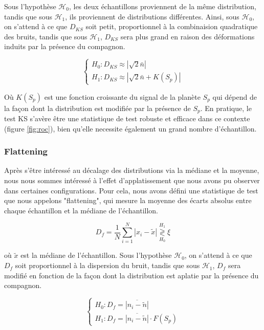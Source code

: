 \documentclass{article}
\begin{document}
Sous l'hypothèse $\mathcal{H}_0$, les deux échantillons proviennent de la même distribution, tandis que sous $\mathcal{H}_1$, ils proviennent de distributions différentes. Ainsi, sous $\mathcal{H}_0$, on s'attend à ce que $D_{KS}$ soit petit, proportionnel à la combinaision quadratique des bruits, tandis que sous $\mathcal{H}_1$, $D_{KS}$ sera plus grand en raison des déformations induits par la présence du compagnon.

$$
\begin{cases}
H_0 : D_{KS} \approx |\sqrt{2}\bar{n}|\\
H_1 : D_{KS} \approx |\sqrt{2}\bar{n} + K(S_p)|
\end{cases}
$$

Où $K(S_p)$ est une fonction croissante du signal de la planète $S_p$ qui dépend de la façon dont la distribution est modifiée par la présence de $S_p$. En pratique, le test KS s'avère être une statistique de test robuste et efficace dans ce contexte (figure \ref{fig:roc}), bien qu'elle necessite également un grand nombre d'échantillon.



\subsubsection{Flattening}

Après s'être intéressé au décalage des distributions via la médiane et la moyenne, nous nous sommes intéressé à l'effet d'applatissement que nous avons pu observer dans certaines configurations. Pour cela, nous avons défini une statistique de test que nous appelons "flattening", qui mesure la moyenne des écarts absolus entre chaque échantillon et la médiane de l'échantillon.

$$
D_f = \frac 1 N \sum_{i=1}^N |x_i - \tilde{x}| \stackrel{H_1}{\underset{H_0}{\gtrless}} \xi
$$

où $\tilde{x}$ est la médiane de l'échantillon. Sous l'hypothèse $\mathcal{H}_0$, on s'attend à ce que $D_f$ soit proportionnel à la dispersion du bruit, tandis que sous $\mathcal{H}_1$, $D_f$ sera modifié en fonction de la façon dont la distribution est aplatie par la présence du compagnon.

$$
\begin{cases}
H_0 : D_f = \overline{|n_i - \tilde{n}|}\\
H_1 : D_f = \overline{|n_i - \tilde{n}|} \cdot F(S_p)
\end{cases}
$$
\end{document}
